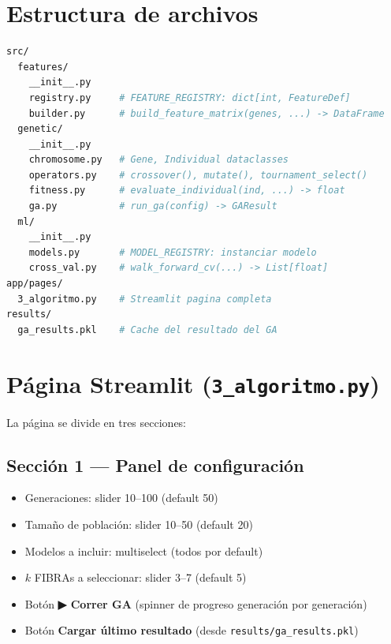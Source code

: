 \documentclass[12pt,letterpaper]{article}
\begin{document}
\section{Estructura de archivos}

\begin{lstlisting}[language=bash]
src/
  features/
    __init__.py
    registry.py     # FEATURE_REGISTRY: dict[int, FeatureDef]
    builder.py      # build_feature_matrix(genes, ...) -> DataFrame
  genetic/
    __init__.py
    chromosome.py   # Gene, Individual dataclasses
    operators.py    # crossover(), mutate(), tournament_select()
    fitness.py      # evaluate_individual(ind, ...) -> float
    ga.py           # run_ga(config) -> GAResult
  ml/
    __init__.py
    models.py       # MODEL_REGISTRY: instanciar modelo
    cross_val.py    # walk_forward_cv(...) -> List[float]
app/pages/
  3_algoritmo.py    # Streamlit pagina completa
results/
  ga_results.pkl    # Cache del resultado del GA
\end{lstlisting}

\section{Página Streamlit (\texttt{3\_algoritmo.py})}

La página se divide en tres secciones:

\subsection{Sección 1 — Panel de configuración}

\begin{itemize}[leftmargin=2em]
  \item Generaciones: slider 10--100 (default 50)
  \item Tamaño de población: slider 10--50 (default 20)
  \item Modelos a incluir: multiselect (todos por default)
  \item $k$ FIBRAs a seleccionar: slider 3--7 (default 5)
  \item Botón \textbf{▶ Correr GA} (spinner de progreso generación por generación)
  \item Botón \textbf{Cargar último resultado} (desde \texttt{results/ga\_results.pkl})
\end{itemize}
\end{document}
